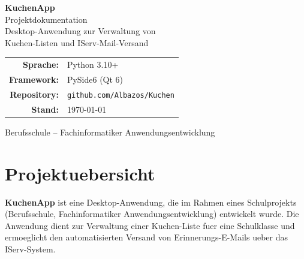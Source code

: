 \documentclass[12pt, a4paper]{article}
\begin{document}
\begin{titlepage}
\centering
{}

\vspace*{1cm}
{\color{white}\Huge\textbf{KuchenApp}}\\[0.4cm]
{\color{white!85}\LARGE Projektdokumentation}\\[4.5cm]

{\Large\color{primary} Desktop-Anwendung zur Verwaltung von\\[0.3cm]
Kuchen-Listen und IServ-Mail-Versand}\\[2.5cm]

\begin{tcolorbox}[
    colback=codebg, colframe=codeborder,
    width=10cm, arc=4pt, boxrule=0.5pt,
    halign=center,
]
\begin{tabular}{rl}
    \textbf{Sprache:} & Python 3.10+ \\
    \textbf{Framework:} & PySide6 (Qt 6) \\
    \textbf{Repository:} & \texttt{github.com/Albazos/Kuchen} \\
    \textbf{Stand:} & \today \\
\end{tabular}
\end{tcolorbox}

\vfill
{\color{codegray}\small Berufsschule -- Fachinformatiker Anwendungsentwicklung}
\end{titlepage}

\tableofcontents
\newpage

\section{Projektuebersicht}

\textbf{KuchenApp} ist eine Desktop-Anwendung, die im Rahmen eines Schulprojekts
(Berufsschule, Fachinformatiker Anwendungsentwicklung) entwickelt wurde. Die Anwendung
dient zur Verwaltung einer Kuchen-Liste fuer eine Schulklasse und ermoeglicht den
automatisierten Versand von Erinnerungs-E-Mails ueber das IServ-System.
\end{document}
